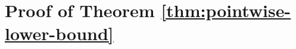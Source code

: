 \documentclass{article}
\theoremstyle{definition}
\theoremstyle{remark}
\theoremstyle{plain}
\numberwithin{equation}{section}
\begin{document}
\section{Proof of Theorem \ref{thm:pointwise-lower-bound}}
\label{app:proof-lower-bound}
\end{document}
